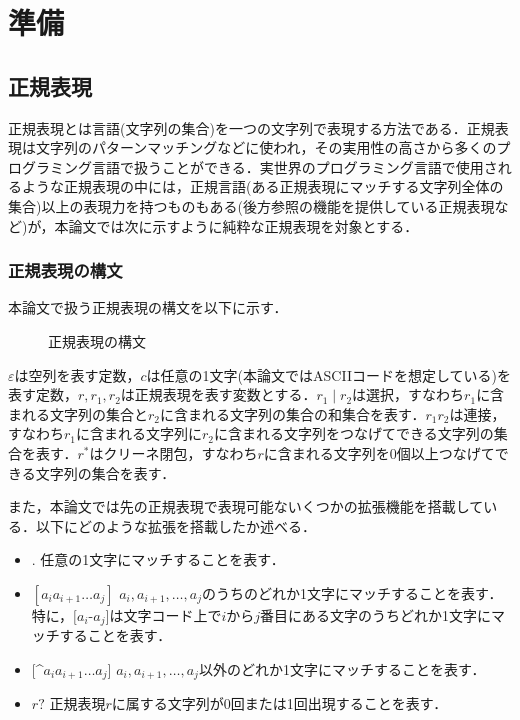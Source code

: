 \documentclass[a4paper, 12pt, dvipdfmx, uplatex]{jsreport}
\begin{document}
\chapter{準備}
\section{正規表現}
正規表現とは言語(文字列の集合)を一つの文字列で表現する方法である．正規表現は文字列のパターンマッチングなどに使われ，その実用性の高さから多くのプログラミング言語で扱うことができる．実世界のプログラミング言語で使用されるような正規表現の中には，正規言語(ある正規表現にマッチする文字列全体の集合)以上の表現力を持つものもある(後方参照の機能を提供している正規表現など)が，本論文では次に示すように純粋な正規表現を対象とする．

\subsection{正規表現の構文}
本論文で扱う正規表現の構文を以下に示す．
\begin{figure}[h]
  \centering
  \setlength{\fboxrule}{0.5pt}
  \caption{正規表現の構文}
  \label{fig:syntax-regex}
\end{figure}

$\varepsilon$は空列を表す定数，$c$は任意の1文字(本論文ではASCIIコードを想定している)を表す定数，$r,r_1,r_2$は正規表現を表す変数とする．$r_1 \mid r_2$は選択，すなわち$r_1$に含まれる文字列の集合と$r_2$に含まれる文字列の集合の和集合を表す．$r_1r_2$は連接，すなわち$r_1$に含まれる文字列に$r_2$に含まれる文字列をつなげてできる文字列の集合を表す．$r^*$はクリーネ閉包，すなわち$r$に含まれる文字列を0個以上つなげてできる文字列の集合を表す．

また，本論文では先の正規表現で表現可能ないくつかの拡張機能を搭載している．以下にどのような拡張を搭載したか述べる．
\begin{itemize}
  \item $.$ \quad 任意の1文字にマッチすることを表す．
  \item $[a_ia_{i+1}\ldots a_j]$ \quad $a_i,a_{i+1},\ldots ,a_j$のうちのどれか1文字にマッチすることを表す．特に，$[a_i$-$a_j]$は文字コード上で$i$から$j$番目にある文字のうちどれか1文字にマッチすることを表す．
  \item $[$^$a_ia_{i+1}\ldots a_j]$ \quad $a_i,a_{i+1},\ldots ,a_j$以外のどれか1文字にマッチすることを表す．
  \item $r?$ \quad 正規表現$r$に属する文字列が0回または1回出現することを表す．
\end{itemize}
\end{document}
